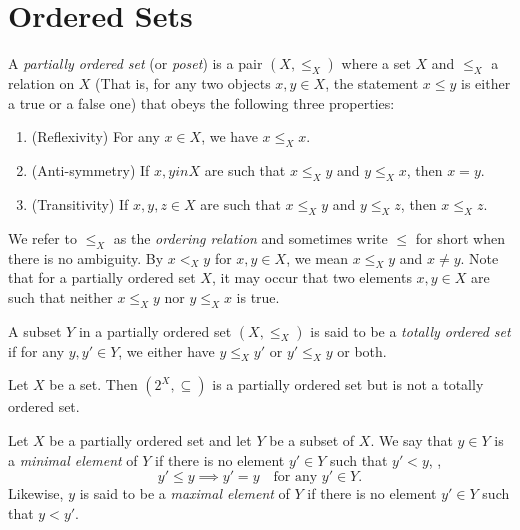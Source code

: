 \section{Ordered Sets}
\begin{defn}
A \emph{partially ordered set} (or \emph{poset}) is a pair $(X, \le_X)$ 
where a set $X$ and $\le_X$ a relation on $X$ (That is, for any two objects 
$x, y \in X$, the statement $x \le y$ is either a true or a false one) that 
obeys the following three properties: 
\begin{enumerate}
    \item (Reflexivity) For any $x \in X$, we have $x \le_X x$. 
    \item (Anti-symmetry) If $x, y in X$ are such that $x \le_X y$ and 
    $y \le_X x$, then $x = y$. 
    \item (Transitivity) If $x, y, z \in X$ are such that $x \le_X y$ and 
    $y \le_X z$, then $x \le_X z$. 
\end{enumerate}
\end{defn}

We refer to $\le_X$ as the \emph{ordering relation} and sometimes write 
$\le$ for short when there is no ambiguity. 
By $x <_X y$ for $x, y \in X$, we mean $x \le_X y$ and $x \neq y$. 
Note that for a partially ordered set $X$, it may occur that two elements 
$x, y \in X$ are such that neither $x \le_X y$ nor $y \le_X x$ is true. 


\begin{defn}
    A subset $Y$ in a partially ordered set $(X, \le_X)$ is said to be a 
    \emph{totally ordered set} if for any $y, y' \in Y$, we either have 
    $y \le_X y'$ or $y' \le_X y$ or both. 
\end{defn}

\begin{example}
Let $X$ be a set. 
Then $(2^X, \subseteq)$ is a partially ordered set but is not a totally 
ordered set. 
\end{example}

\begin{defn}
Let $X$ be a partially ordered set and let $Y$ be a subset of $X$. 
We say that $y \in Y$ is a \emph{minimal element} of $Y$ if there is no 
element $y' \in Y$ such that $y ' < y$, \ie, 
\begin{equation*}
    y' \le y \implies y' = y \quad \text{for any } y' \in Y.
\end{equation*}
Likewise, $y$ is said to be a \emph{maximal element} of $Y$ if there is 
no element $y' \in Y$ such that $y < y'$. 
\end{defn}

